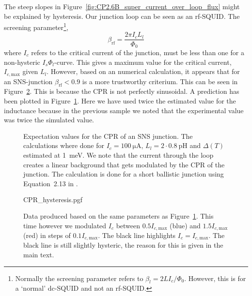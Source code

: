 The steep slopes in Figure~\ref{fig:CP2.6B_super_current_over_loop_flux} might be explained by hysteresis. Our junction loop can be seen as an rf-SQUID.\cite{clarkeSQUIDHandbook2004} The screening parameter\footnote{Normally the screening parameter refers to $\beta_l = 2LI_c/\Phi_0$. However, this is for a `normal' dc-SQUID and not an rf-SQUID.},
\begin{equation}
	\beta_{\text{rf}} = \frac{2\pi I_c L_l}{\Phi_0}
\end{equation}
where $I_c$ refers to the critical current of the junction, must be less than one for a non-hysteric $I_s\Phi_l$-curve\cite{clarkeSQUIDHandbook2004,frolovMeasurementCurrentPhaseRelation2004}. This gives a maximum value for the critical current, $I_{c,\text{max}}$ given $L_l$. However, based on an numerical calculation, it appears that for an SNS-junction $\beta_{\text{rf}} < 0.9$ is a more trustworthy criterium. This can be seen in Figure~\ref{fig:CPR-hysteresis}. This is because the CPR is not perfectly sinusoidal\cite{vermeerSTMbasedScanningSQUID2021,likharevSuperconductingWeakLinks1979}. A prediction has been plotted in Figure~\ref{fig:CP3.5A-analytical-prediction}. Here we have used twice the estimated value for the inductance because in the previous sample we noted that the experimental value was twice the simulated value.

\begin{figure}[ht!]
	\centering
	
	\caption{Expectation values for the CPR of an SNS junction. The calculations where done for $I_c=\qty{100}{\micro\ampere}$, $L_l=2 \cdot \qty{0.8}{\pico\henry}$ and $\Delta(T)$ estimated at \qty{1}{\milli\electronvolt}. We note that the current through the loop creates a linear background that gets modulated by the CPR of the junction. The calculation is done for a short ballistic junction using Equation~2.13 in \cite{vermeerSTMbasedScanningSQUID2021}.}
	\label{fig:CP3.5A-analytical-prediction}
\end{figure}

\begin{figure}
	\centering
	{CPR_hysteresis.pgf}
	\caption{Data produced based on the same parameters as Figure~\ref{fig:CP3.5A-analytical-prediction}. This time however we modulated $I_c$ between $0.5I_{c,\text{max}}$ (blue) and $1.5I_{c,\text{max}}$ (red) in steps of $0.1I_{c,\text{max}}$. The black line highlights $I_c=I_{c,\text{max}}$. The black line is still slightly hysteric, the reason for this is given in the main text.}
	\label{fig:CPR-hysteresis}
\end{figure}


